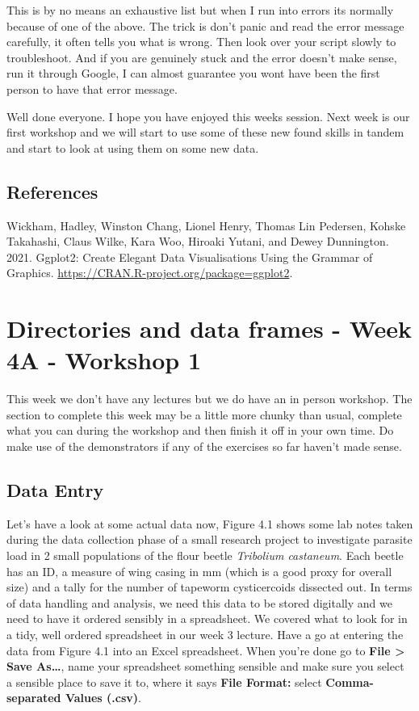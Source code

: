 \documentclass[
]{book}
\begin{document}
This is by no means an exhaustive list but when I run into errors its normally because of one of the above. The trick is don't panic and read the error message carefully, it often tells you what is wrong. Then look over your script slowly to troubleshoot. And if you are genuinely stuck and the error doesn't make sense, run it through Google, I can almost guarantee you wont have been the first person to have that error message.

Well done everyone. I hope you have enjoyed this weeks session. Next week is our first workshop and we will start to use some of these new found skills in tandem and start to look at using them on some new data.

\hypertarget{references}{%
\section{References}\label{references}}

Wickham, Hadley, Winston Chang, Lionel Henry, Thomas Lin Pedersen, Kohske Takahashi, Claus Wilke, Kara Woo, Hiroaki Yutani, and Dewey Dunnington. 2021. Ggplot2: Create Elegant Data Visualisations Using the Grammar of Graphics. \url{https://CRAN.R-project.org/package=ggplot2}.

\hypertarget{data-frames}{%
\chapter{Directories and data frames - Week 4A - Workshop 1}\label{data-frames}}

This week we don't have any lectures but we do have an in person workshop. The section to complete this week may be a little more chunky than usual, complete what you can during the workshop and then finish it off in your own time. Do make use of the demonstrators if any of the exercises so far haven't made sense.

\hypertarget{data-entry}{%
\section{Data Entry}\label{data-entry}}

Let's have a look at some actual data now, Figure 4.1 shows some lab notes taken during the data collection phase of a small research project to investigate parasite load in 2 small populations of the flour beetle \emph{Tribolium castaneum}. Each beetle has an ID, a measure of wing casing in mm (which is a good proxy for overall size) and a tally for the number of tapeworm cysticercoids dissected out. In terms of data handling and analysis, we need this data to be stored digitally and we need to have it ordered sensibly in a spreadsheet. We covered what to look for in a tidy, well ordered spreadsheet in our week 3 lecture. Have a go at entering the data from Figure 4.1 into an Excel spreadsheet. When you're done go to \textbf{File \textgreater{} Save As\ldots{}}, name your spreadsheet something sensible and make sure you select a sensible place to save it to, where it says \textbf{File Format:} select \textbf{Comma-separated Values (.csv)}.
\end{document}
